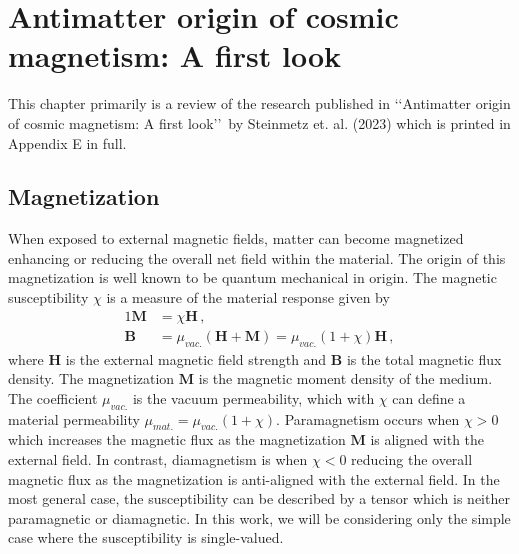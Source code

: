 \chapter{Antimatter origin of cosmic magnetism: A first look}
\label{chap:cosmo}
\noindent This chapter primarily is a review of the research published in \lq\lq Antimatter origin of cosmic magnetism: A first look\rq\rq\ by Steinmetz et. al. (2023) which is printed in Appendix E in full.\\

\section{Magnetization}
\label{section:magnetization}
\noindent When exposed to external magnetic fields, matter can become magnetized enhancing or reducing the overall net field within the material. The origin of this magnetization is well known to be quantum mechanical in origin. The magnetic susceptibility $\chi$ is a measure of the material response given by
\begin{alignat}{1}
  \label{CHIeq01} \textbf{M}&=\chi\textbf{H}\,,\\
  \label{CHIeq02} \textbf{B}&=\mu_{vac.}\left(\textbf{H}+\textbf{M}\right)=\mu_{vac.}\left(1+\chi\right)\textbf{H}\,,
\end{alignat}
where $\textbf{H}$ is the external magnetic field strength and $\textbf{B}$ is the total magnetic flux density. The magnetization $\textbf{M}$ is the magnetic moment density of the medium. The coefficient $\mu_{vac.}$ is the vacuum permeability, which with $\chi$ can define a material permeability $\mu_{mat.}=\mu_{vac.}(1+\chi)$. Paramagnetism occurs when $\chi>0$ which increases the magnetic flux as the magnetization $\textbf{M}$ is aligned with the external field. In contrast, diamagnetism is when $\chi<0$ reducing the overall magnetic flux as the magnetization is anti-aligned with the external field. In the most general case, the susceptibility can be described by a tensor which is neither paramagnetic or diamagnetic. In this work, we will be considering only the simple case where the susceptibility is single-valued.

